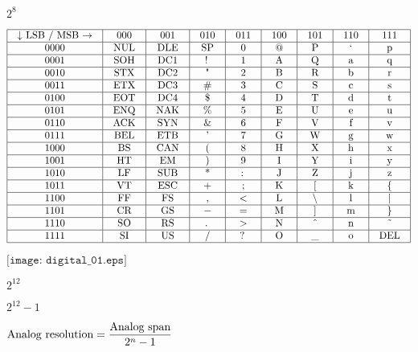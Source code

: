 \documentclass[12pt,a4paper,margin=2cm]{book}
\def\lthtmlcheckvsize{\ifdim\ht\sizebox<\vsize 
  \ifdim\wd\sizebox<\hsize\expandafter\hfill\fi \expandafter\vfill
  \else\expandafter\vss\fi}%
\begin{document}
{\newpage\clearpage
{}%
$ 2^8$%
\lthtmlindisplaymathZ
\lthtmlcheckvsize\clearpage}

{\newpage\clearpage
{}%
$\displaystyle \vbox{\offinterlineskip
\halign{\strut
\vrule \quad\hfil # \  \hfil & 
\vrule \quad\hfil # \  \hfil & 
\vrule \quad\hfil # \  \hfil & 
\vrule \quad\hfil # \  \hfil & 
\vrule \quad\hfil # \  \hfil & 
\vrule \quad\hfil # \  \hfil & 
\vrule \quad\hfil # \  \hfil & 
\vrule \quad\hfil # \  \hfil & 
\vrule \quad\hfil # \  \hfil \vrule \cr
\noalign{\hrule }
$\downarrow$ LSB / MSB $\rightarrow$ & 000 & 001 & 010 & 011 & 100 & 101 & 110 & 111 \cr
\noalign{\hrule }
0000 & NUL & DLE & SP & 0 & @ & P & ` & p \cr
\noalign{\hrule }
0001 & SOH & DC1 & ! & 1 & A & Q & a & q \cr
\noalign{\hrule }
0010 & STX & DC2 & " & 2 & B & R & b & r \cr
\noalign{\hrule }
0011 & ETX & DC3 & \# & 3 & C & S & c & s \cr
\noalign{\hrule }
0100 & EOT & DC4 & \$ & 4 & D & T & d & t \cr
\noalign{\hrule }
0101 & ENQ & NAK & \% & 5 & E & U & e & u \cr
\noalign{\hrule }
0110 & ACK & SYN & \& & 6 & F & V & f & v \cr
\noalign{\hrule }
0111 & BEL & ETB & ' & 7 & G & W & g & w \cr
\noalign{\hrule }
1000 & BS & CAN & ( & 8 & H & X & h & x \cr
\noalign{\hrule }
1001 & HT & EM & ) & 9 & I & Y & i & y \cr
\noalign{\hrule }
1010 & LF & SUB & * & : & J & Z & j & z \cr
\noalign{\hrule }
1011 & VT & ESC & + & ; & K & $[$ & k & $\{$ \cr
\noalign{\hrule }
1100 & FF & FS & , & $<$ & L & $\backslash$ & l & $|$ \cr
\noalign{\hrule }
1101 & CR & GS & $-$ & $=$ & M & $]$ & m & $\}$ \cr
\noalign{\hrule }
1110 & SO & RS & . & $>$ & N & \^{} & n & \~{} \cr
\noalign{\hrule }
1111 & SI & US & / & ? & O & \_ & o & DEL \cr
\noalign{\hrule }
} %
}$%
\lthtmlindisplaymathZ
\lthtmlcheckvsize\clearpage}

{\newpage\clearpage
{}%
$\displaystyle \texttt{[image: digital\_01.eps]}$%
\lthtmlindisplaymathZ
\lthtmlcheckvsize\clearpage}

{\newpage\clearpage
{}%
$ 2^{12}$%
\lthtmlindisplaymathZ
\lthtmlcheckvsize\clearpage}

{\newpage\clearpage
{}%
$ 2^{12} - 1$%
\lthtmlindisplaymathZ
\lthtmlcheckvsize\clearpage}

{\newpage\clearpage
{}%
$\displaystyle \hbox{Analog resolution} = {\hbox{Analog span} \over {2^n - 1}}$%
\lthtmlindisplaymathZ
\lthtmlcheckvsize\clearpage}
\end{document}
